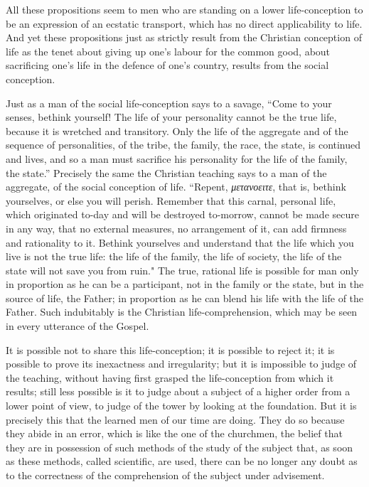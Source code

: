 \documentclass{book}
\begin{document}
All these propositions seem to men who are standing on a lower life-conception to be an expression of an ecstatic transport, which has no direct applicability to life. And yet these propositions just as strictly result from the Christian conception of life as the tenet about giving up one’s labour for the common good, about sacrificing one’s life in the defence of one’s country, results from the social conception.

Just as a man of the social life-conception says to a savage, “Come to your senses, bethink yourself! The life of your personality cannot be the true life, because it is wretched and transitory. Only the life of the aggregate and of the sequence of personalities, of the tribe, the family, the race, the state, is continued and lives, and so a man must sacrifice his personality for the life of the family, the state.” Precisely the same the Christian teaching says to a man of the aggregate, of the social conception of life. “Repent, \emph{μετανοειτε}, that is, bethink yourselves, or else you will perish. Remember that this carnal, personal life, which originated to-day and will be destroyed to-morrow, cannot be made secure in any way, that no external measures, no arrangement of it, can add firmness and rationality to it. Bethink yourselves and understand that the life which you live is not the true life: the life of the family, the life of society, the life of the state will not save you from ruin." The true, rational life is possible for man only in proportion as he can be a participant, not in the family or the state, but in the source of life, the Father; in proportion as he can blend his life with the life of the Father. Such indubitably is the Christian life-comprehension, which may be seen in every utterance of the Gospel.

It is possible not to share this life-conception; it is possible to reject it; it is possible to prove its inexactness and irregularity; but it is impossible to judge of the teaching, without having first grasped the life-conception from which it results; still less possible is it to judge about a subject of a higher order from a lower point of view, to judge of the tower by looking at the foundation. But it is precisely this that the learned men of our time are doing. They do so because they abide in an error, which is like the one of the churchmen, the belief that they are in possession of such methods of the study of the subject that, as soon as these methods, called scientific, are used, there can be no longer any doubt as to the correctness of the comprehension of the subject under advisement.
\end{document}
